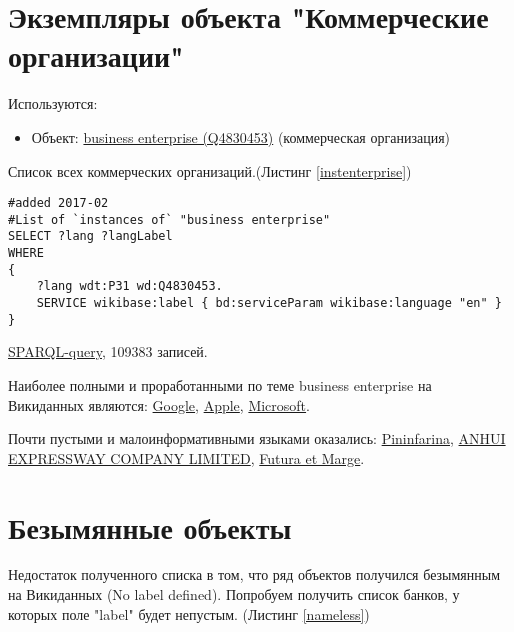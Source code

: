 \section*{Экземпляры объекта "Коммерческие организации"}

Используются:

\begin{itemize}
    \item Объект: \href{https://www.wikidata.org/wiki/Q4830453}{business enterprise (Q4830453)} (коммерческая организация)
\end{itemize}

Список всех коммерческих организаций.(Листинг \ref{instenterprise})

\begin{lstlisting}[language=SPARQL,label=instenterprise,caption=Список всех коммерческих организаций]
#added 2017-02
#List of `instances of` "business enterprise" 
SELECT ?lang ?langLabel
WHERE
{
    ?lang wdt:P31 wd:Q4830453.
    SERVICE wikibase:label { bd:serviceParam wikibase:language "en" }
}
\end{lstlisting}

\href{https://query.wikidata.org/#%23List%20of%20%60instances%20of%60%20%22business%20enterprise%22%20%0ASELECT%20%3Flang%20%3FlangLabel%0AWHERE%0A%7B%0A%20%20%20%20%3Flang%20wdt%3AP31%20wd%3AQ4830453.%0A%20%20%20%20SERVICE%20wikibase%3Alabel%20%7B%20bd%3AserviceParam%20wikibase%3Alanguage%20%22en%22%20%7D%0A%7D}{SPARQL-query}, 109383 записей.

Наиболее полными и проработанными по теме business enterprise на Викиданных являются:
\href{https://www.wikidata.org/wiki/Q95}{Google}, 
\href{https://www.wikidata.org/wiki/Q312}{Apple},
\href{https://www.wikidata.org/wiki/Q2283}{Microsoft}.

Почти пустыми и малоинформативными языками оказались:
\href{https://www.wikidata.org/wiki/Q40987}{Pininfarina},
\href{https://www.wikidata.org/wiki/Q46065}{ANHUI EXPRESSWAY COMPANY LIMITED},
\href{https://www.wikidata.org/wiki/Q45812}{Futura et Marge}.

\section*{Безымянные объекты}

Недостаток полученного списка в том, что ряд объектов получился безымянным на Викиданных (No label defined). Попробуем получить список банков, у которых поле "label" будет непустым. (Листинг \ref{nameless})

